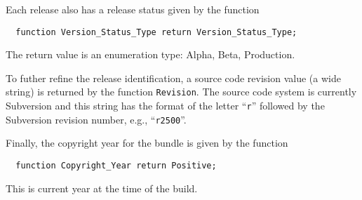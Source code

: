 Each release also has a release status given by the function
\begin{small}
\begin{verbatim}
  function Version_Status_Type return Version_Status_Type;
\end{verbatim}
\end{small}
The return value is an enumeration type: Alpha, Beta, Production.

To futher refine the release identification, a source code
revision value (a wide string) is returned by the function
\texttt{Revision}.  The source code system is currently Subversion
and this string has the format of the letter ``\texttt{r}'' followed by the
Subversion revision number, e.g., ``\texttt{r2500}''.

Finally, the copyright year for the bundle is given by the function
\begin{small}
\begin{verbatim}
  function Copyright_Year return Positive;
\end{verbatim}
\end{small}
This is current year at the time of the build.
